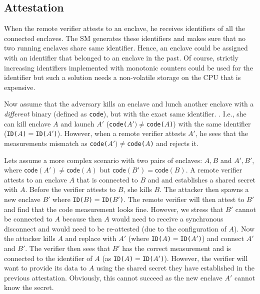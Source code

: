 \subsection{Attestation} 

When the remote verifier attests to an enclave, he receives identifiers of all the connected enclaves. The SM generates these identifiers and makes sure that no two running enclaves share same identifier. Hence, an enclave could be assigned with an identifier that belonged to an enclave in the past. Of course, strictly increasing identifiers implemented with monotonic counters could be used for the identifier but such a solution needs a non-volatile storage on the CPU that is expensive. 

Now assume that the adversary kills an enclave and lunch another enclave with a \emph{different} binary (defined as \texttt{code}), but with the exact same identifier. . I.e., she can kill enclave $A$ and launch $A'$ (\texttt{code($A')\neq$code($A$)}) with the same identifier (\texttt{ID($A$)$=$ID($A'$)}). However, when a remote verifier attests $A'$, he sees that the measurements mismatch as \texttt{code($A')\neq$code($A$)} and rejects it.

Lets assume a more complex scenario with two pairs of enclaves: $A, B$ and $A', B'$, where $\textsf{code} (A')\neq \textsf{code} (A)$ but $\textsf{code} (B') = \textsf{code} (B)$. 
A remote verifier attests to an enclave $A$ that is connected to $B$ and and establishes a shared secret with $A$. Before the verifier attests to $B$, she kills $B$. The attacker then spawns a new enclave $B'$ where \texttt{ID($B$)$=$ID($B'$)}. The remote verifier will then attest to $B'$ and find that the code measurement looks fine. However, we stress that $B'$ cannot be connected to $A$ because then $A$ would need to receive a synchronous disconnect and would need to be re-attested (due to the configuration of $A$). Now the attacker kills $A$ and replace with $A'$ (where \texttt{ID($A$)$=$ID($A'$)}) and connect $A'$ and $B'$. The verifier then sees that $B'$ has the correct measurement and is connected to the identifier of $A$ (as \texttt{ID($A$)$=$ID($A'$)}). However, the verifier will want to provide its data to $A$ using the shared secret they have established in the previous attestation. Obviously, this cannot succeed as the new enclave $A'$ cannot know the secret.
 

